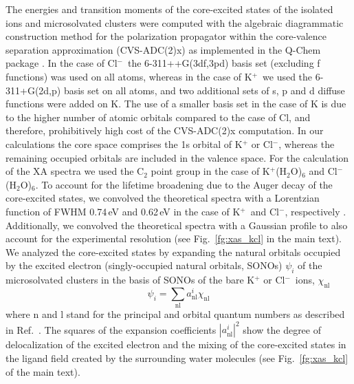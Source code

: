 \documentclass[journal=jpclcd,manuscript=letter]{achemso}
\begin{document}
The energies and transition moments of the core-excited states of the isolated ions and microsolvated clusters were computed with the algebraic diagrammatic construction method for the polarization propagator \citep{sch82:2395} within the core-valence separation approximation \citep{bar85:867,ced80:206,ced81:1038} (CVS-ADC(2)x) as implemented in the Q-Chem package \citep{Wenzel14:1900,Wenzel14:4583,Wormit14:774,QChem2015}. In the case of Cl$^{-}$~the 6-311++G(3df,3pd) basis set \citep{Krishnan80:650,McLean80:5639} (excluding f functions) was used on all atoms, whereas in the case of K$^{+}$~we used the 6-311+G(2d,p) basis set \citep{Krishnan80:650,Blaudeau97:5016} on all atoms, and two additional sets of s, p and d diffuse functions were added on K. The use of a smaller basis set in the case of K is due to the higher number of atomic orbitals compared to the case of Cl, and therefore, prohibitively high cost of the CVS-ADC(2)x computation. In our calculations the core space comprises the 1s orbital of K$^{+}$ or Cl$^{-}$, whereas the remaining occupied orbitals are included in the valence space. For the calculation of the XA spectra we used the C$_2$ point group in the case of K$^{+}$(H$_2$O)$_6$ and Cl$^{-}$(H$_2$O)$_6$. To account for the lifetime broadening due to the Auger decay of the core-excited states, we convolved the theoretical spectra with a Lorentzian function of FWHM 0.74\,eV and 0.62\,eV in the case of K$^{+}$~and Cl$^{-}$, respectively \citep{Krause79:329}. Additionally, we convolved the theoretical spectra with a Gaussian profile to also account for the experimental resolution (see Fig.\ \ref{fg:xas_kcl} in the main text). We analyzed the core-excited states by expanding the natural orbitals occupied by the excited electron (singly-occupied natural orbitals, SONOs) $\psi_{i}$ of the microsolvated clusters in the basis of SONOs of the bare K$^{+}$ or Cl$^{-}$~ions, $\chi_{\text{nl}}$
%
\begin{equation}
\psi_{i} = \sum_{\text{nl}} a^{i}_{\text{nl}} \chi_{\text{nl}}
\end{equation}
%
where n and l stand for the principal and orbital quantum numbers as described in Ref.\ \citep{miteva16:16671}. The squares of the expansion coefficients $|a^{i}_{\text{nl}}|^{2}$ show the degree of delocalization of the excited electron and the mixing of the core-excited states in the ligand field created by the surrounding water molecules (see Fig.\ \ref{fg:xas_kcl} of the main text).
\end{document}
